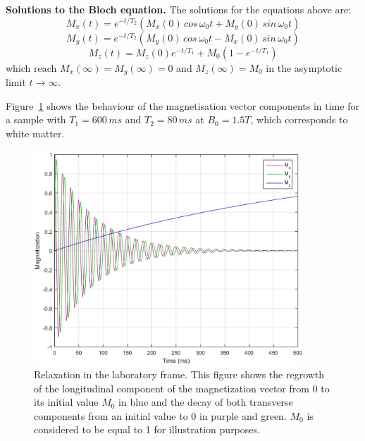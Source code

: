 \textbf{Solutions to the Bloch equation.} 
The solutions for the equations above are:
\begin{equation} \label{eq:425}
    M_x(t) = e^{-t/T_2} (M_x(0) \, cos \, \omega_0 t + M_y(0) \, sin \, \omega_0 t)
\end{equation}
\begin{equation} \label{eq:426}
    M_y(t) = e^{-t/T_2} (M_y(0) \, cos \, \omega_0 t - M_x(0) \, sin \, \omega_0 t)
\end{equation}
\begin{equation} \label{eq:427}
    M_z(t) = M_z(0) e^{-t/T_1} + M_0 (1 - e^{-t/T_1})
\end{equation}
which reach $M_x(\infty) = M_y(\infty) = 0$ and $M_z(\infty) = M_0$ in the asymptotic limit $t \rightarrow \infty$.

Figure~\ref{fig:ch4MxMyMz} shows the behaviour of the magnetisation vector components in time for a sample with $T_1 = 600 \, ms$ and $T_2 = 80 \, ms$ at $B_0 = 1.5T$, which corresponds to white matter.

\begin{figure}[ht]
    \centering
    \includegraphics[width=0.9\textwidth,keepaspectratio]{images/mri/ch4MxMyMz}
    \caption{Relaxation in the laboratory frame. This figure shows the regrowth of the longitudinal component of the magnetization vector from 0 to its initial value $M_0$ in blue and the decay of both transverse components from an initial value to 0 in purple and green. $M_0$ is considered to be equal to 1 for illustration purposes.}
    \label{fig:ch4MxMyMz}
\end{figure}

